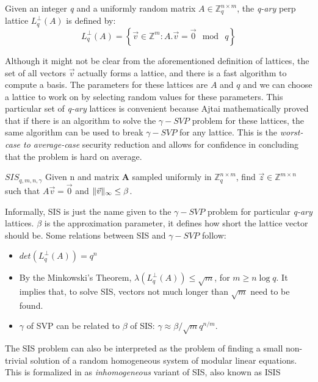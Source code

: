 \begin{definition}
  Given an integer \emph{q} and a uniformly random matrix
  $A \in \mathbb{Z}_{q}^{n \times m}$, the \emph{q-ary} perp lattice
  $L_q^\bot(A)$ is defined by:
  \[
    L_q^\bot(A) = \left\{ \vec{v} \in \mathbb{Z}^m : A.\vec{v} = \vec{0} \mod \
      q \right\}
  \]
\end{definition}
Although it might not be clear from the aforementioned definition of lattices, the set of all vectors
$\vec{v}$ actually forms a lattice,  and
there is a fast algorithm to compute a basis. The parameters for these
lattices are $A$ and $q$ and we can choose a lattice to work on by selecting random
values for these parameters. This particular set of \emph{q-ary} lattices is convenient
because Ajtai mathematically proved that if there is an algorithm to solve the
$\gamma-SVP$ problem for these lattices, the same algorithm can be used to break
$\gamma-SVP$ for any lattice. This is the \emph{worst-case to average-case}
security reduction and allows for confidence in concluding that the problem is hard on average.
\begin{definition}
  $SIS_{q,m,n,\gamma}$ Given n and matrix $\mathbf{A}$ sampled uniformly in
  $\mathbb{Z}_q^{n \times m}$, find $\vec{z} \in \mathbb{Z}^{m \times n}$ such
  that $A\vec{v} = \vec{0}$ and $\Vert \vec{v} \Vert_{\infty} \leq \beta$.
  \label{def:SISProblem}
\end{definition}
Informally, SIS is just the name given to the $\gamma-SVP$ problem for
particular \emph{q-ary} lattices. $\beta$ is the approximation parameter, it
defines how short the lattice vector should be. Some relations between SIS and
$\gamma-SVP$ follow:
\begin{itemize}
\item $det(L_q^\bot(A)) = q^n$
\item By the Minkowski's Theorem, $\lambda(L_q^\bot(A)) \leq \sqrt{m}$, for
  $m \geq n \log q$. It implies that, to solve SIS, vectors not much longer
  than $\sqrt{m}$ need to be found.
\item  $\gamma$ of SVP can be related to $\beta$ of SIS:
  $\gamma \approx \beta/\sqrt{m}q^{n/m}$.
\end{itemize}

The SIS problem can also be interpreted as the problem of finding a small
non-trivial solution of a random homogeneous system of modular linear
equations. This is formalized in \cite{gentry2008trapdoors} as
\textit{inhomogeneous} variant of SIS, also known as ISIS

